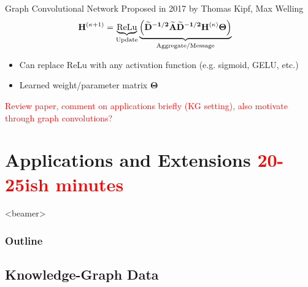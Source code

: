 \documentclass{beamer}
\newcommand{\OutlineRedux}
{
  \begin{frame}<beamer>
    \frametitle{Outline}
    \tableofcontents[currentsection]
  \end{frame}
}
\newcommand{\node}{v}
\newcommand{\nrepresent}{h}
\newcommand{\NodeRepMat}{\mathbf{H}}
\newcommand{\edge}{e}
\newcommand{\DegMat}{\mathbf{D}}
\newcommand{\iter}{\kappa}
\newcommand{\AdjMat}{\mathbf{A}}
\newcommand{\ReLu}{\text{ReLu}}
\begin{document}
\begin{frame}{Graph Convolutional Network}
    Proposed in 2017 by Thomas Kipf, Max Welling \cite{kipf_semi-supervised_2017}
        \begin{align*}
        \iffalse
            \mathbf{\nrepresent}_\node^{(\iter+1)} 
            &=
            \text{Update}
            \left( 
            x_\node^{(\iter)}
            ,   
            \text{Aggregate}
            (
                \nrepresent_\node^{(\iter)}, x_u^{(\iter)}, \edge_{u,\node}^{(\iter)}
            )
            \right)
        \\
        \fi 
            \NodeRepMat^{(\iter+1)} 
            &=
            \underbrace{\ReLu}_{\text{Update}}
            \underbrace{
            \left( 
                \mathbf{
                \widetilde{\DegMat}^{-1/2}
                \widetilde{\AdjMat}
                \widetilde{\DegMat}^{-1/2}  
                \NodeRepMat^{(\iter)}
                \Theta 
                }            
            \right)
            }_{\text{Aggregate/Message}}
    \end{align*}
    
    \begin{itemize}
        \item Can replace ReLu with any activation function (e.g. sigmoid, GELU, etc.)
        \item Learned weight/parameter matrix $\boldsymbol\Theta$
    \end{itemize}
    \textcolor{red}{Review paper, comment on applications briefly (KG setting), also motivate through graph convolutions?}
    \end{frame}



\section{Applications and Extensions \textcolor{red}{20-25ish minutes}}
\OutlineRedux


\subsection{Knowledge-Graph Data}
\end{document}
